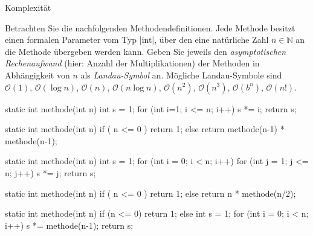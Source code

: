 
\begin{exercise}{Komplexität}
\begin{body}
Betrachten Sie die nachfolgenden Methodendefinitionen. Jede Methode besitzt einen formalen Parameter vom Typ \code|int|, über den eine natürliche Zahl $n \in \mathbb{N}$ an die Methode übergeben werden kann. Geben Sie jeweils den \emph{asymptotischen Rechenaufwand} (hier: Anzahl der Multiplikationen) der Methoden in Abhängigkeit von $n$ als \emph{Landau-Symbol} an. M\"ogliche Landau-Symbole sind $\mathcal{O}(1)$, $\mathcal{O}(\log n)$, $\mathcal{O}(n)$, $\mathcal{O}(n \log n)$, $\mathcal{O}(n^2)$, $\mathcal{O}(n^3)$, $\mathcal{O}(b^n)$, $\mathcal{O}(n!)$.
\begin{parts}
\item
\begin{displaycode}
    static int methode(int n) {
        int s = 1;
        for (int i=1; i <= n; i++) {
            s *= i;
        }
        return s;
    }
\end{displaycode}

\item
\begin{displaycode}
    static int methode(int n) {
        if ( n <= 0 ) {
            return 1;
        } else {
            return methode(n-1) * methode(n-1);
        }
    }
\end{displaycode}

\item
\begin{displaycode}
    static int methode(int n) {
        int s = 1;
        for (int i = 0; i < n; i++) {
            for (int j = 1; j <= n; j++) {
            	s *= j;
            }
        }
        return s;
    }
\end{displaycode}

\item
\begin{displaycode}
    static int methode(int n) {
        if ( n <= 0 ) {
            return 1;
        } else {
            return n * methode(n/2);
        }
    }
\end{displaycode}


\item
\begin{displaycode}
    static int methode(int n) {
        if (n <= 0) {
            return 1;
        } else {
            int s = 1;
            for (int i = 0; i < n; i++) {
            	s *= methode(n-1);
            }
            return s;
        }
    }
\end{displaycode}



\end{parts}
\end{body}
\end{exercise}
